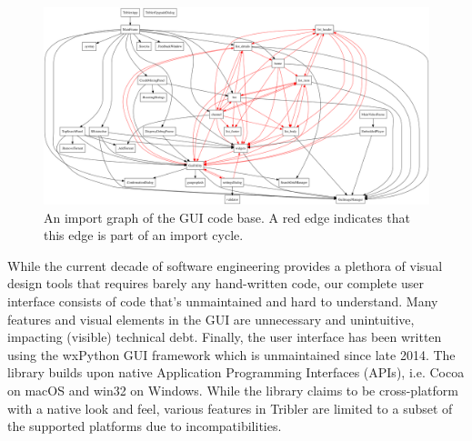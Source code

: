 \begin{figure}[t]
	\centering
	\includegraphics[width=1.0\columnwidth]{images/problem_description/wx_cycles}
	\caption{An import graph of the GUI code base. A red edge indicates that this edge is part of an import cycle.}
	\label{fig:wx-import-graph}
\end{figure}

\noindent While the current decade of software engineering provides a plethora of visual design tools that requires barely any hand-written code, our complete user interface consists of code that's unmaintained and hard to understand. Many features and visual elements in the GUI are unnecessary and unintuitive, impacting (visible) technical debt. Finally, the user interface has been written using the wxPython GUI framework which is unmaintained since late 2014. The library builds upon native Application Programming Interfaces (APIs), i.e. Cocoa on macOS and win32 on Windows. While the library claims to be cross-platform with a native look and feel, various features in Tribler are limited to a subset of the supported platforms due to incompatibilities.

